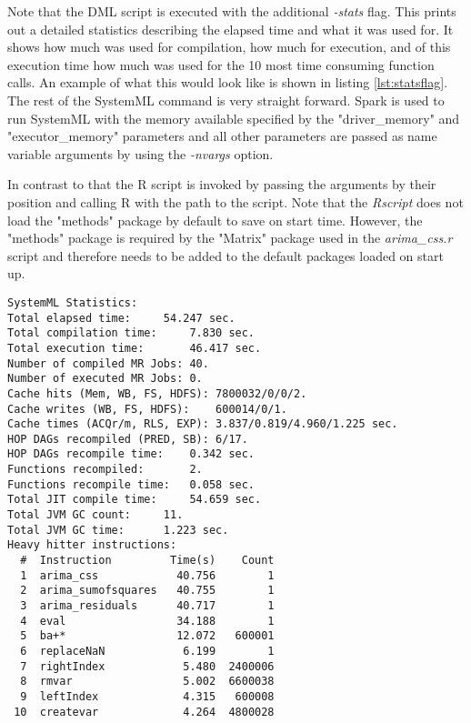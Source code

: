 Note that the \acs{DML} script is executed with the additional \textit{-stats} flag. This prints out a
detailed statistics describing the elapsed time and what it was used for. It shows how much was used for compilation, how much for execution, and of this execution time how much was used for the 10 most time consuming function calls. An example of what this would look like is shown in listing \ref{lst:statsflag}. The rest of the SystemML command is very straight forward. Spark is used to run SystemML with the memory available specified by the "driver\_memory" and "executor\_memory" parameters and all other parameters are passed as name variable arguments by using the \textit{-nvargs} option.

In contrast to that the R script is invoked by passing the arguments by their position and calling R with the path to the script. Note that the \textit{Rscript} does not load the "methods" package  by default to save on start time. However, the "methods" package is required by the "Matrix" package used in the \textit{arima\_css.r} script and therefore needs to be added to the default packages loaded on start up.


\begin{lstlisting}[caption=Example of \textit{arima.dml} script run with \textit{-stats} flag \label{lst:statsflag},captionpos=b]
SystemML Statistics:
Total elapsed time:		54.247 sec.
Total compilation time:		7.830 sec.
Total execution time:		46.417 sec.
Number of compiled MR Jobs:	40.
Number of executed MR Jobs:	0.
Cache hits (Mem, WB, FS, HDFS):	7800032/0/0/2.
Cache writes (WB, FS, HDFS):	600014/0/1.
Cache times (ACQr/m, RLS, EXP):	3.837/0.819/4.960/1.225 sec.
HOP DAGs recompiled (PRED, SB):	6/17.
HOP DAGs recompile time:	0.342 sec.
Functions recompiled:		2.
Functions recompile time:	0.058 sec.
Total JIT compile time:		54.659 sec.
Total JVM GC count:		11.
Total JVM GC time:		1.223 sec.
Heavy hitter instructions:
  #  Instruction         Time(s)    Count
  1  arima_css            40.756        1
  2  arima_sumofsquares   40.755        1
  3  arima_residuals      40.717        1
  4  eval                 34.188        1
  5  ba+*                 12.072   600001
  6  replaceNaN            6.199        1
  7  rightIndex            5.480  2400006
  8  rmvar                 5.002  6600038
  9  leftIndex             4.315   600008
 10  createvar             4.264  4800028
\end{lstlisting}


